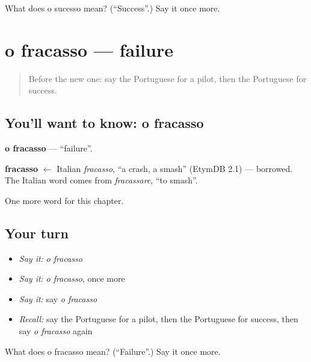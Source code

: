 \begin{tcolorbox}[breakable,colback=teal!4,colframe=teal!35!black,title={Before you move on}]
What does o sucesso mean? (\textquotedblleft{}Success\textquotedblright{}.) Say it once more.
\end{tcolorbox}
\section[o fracasso]{o fracasso — failure}

\label{lesson:PT-C247-fracasso}



\begin{quote}
Before the new one: say the Portuguese for a pilot, then the Portuguese for success.
\end{quote}

\subsection*{You'll want to know: o fracasso}
\textbf{o fracasso} — \textquotedblleft{}failure\textquotedblright{}.

\begin{cousinweb}
\textbf{fracasso} $\leftarrow$ Italian \emph{fracasso}, \textquotedblleft{}a crash, a smash\textquotedblright{} (EtymDB 2.1) — borrowed. The Italian word comes from \emph{fracassare}, \textquotedblleft{}to smash\textquotedblright{}.
\end{cousinweb}

\begin{grammarlens}[title={What you've built}]
One more word for this chapter.
\end{grammarlens}

\subsection*{Your turn}
\begin{itemize}
\raggedright
  \item \emph{Say it:} \emph{o fracasso}
  \item \emph{Say it:} \emph{o fracasso}, once more
  \item \emph{Say it:} say \emph{o fracasso}
  \item \emph{Recall:} say the Portuguese for a pilot, then the Portuguese for success, then say \emph{o fracasso} again
\end{itemize}

\begin{tcolorbox}[breakable,colback=teal!4,colframe=teal!35!black,title={Before you move on}]
What does o fracasso mean? (\textquotedblleft{}Failure\textquotedblright{}.) Say it once more.
\end{tcolorbox}
